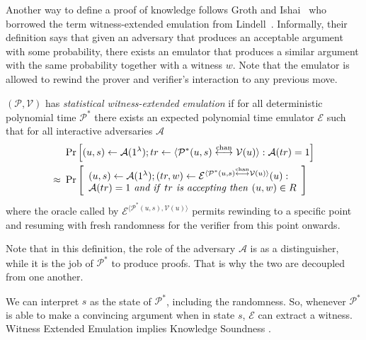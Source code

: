 Another way to define a proof of knowledge follows Groth and Ishai~\cite{GrI08} who borrowed the term witness-extended emulation from Lindell~\cite{Lin03}. Informally, their definition says that given an adversary that produces an acceptable argument with some probability, there exists an emulator that produces a similar argument with the same probability together with a witness $w$. Note that the emulator is allowed to rewind the prover and verifier's interaction to any previous move.

\begin{definition}
$(\mathcal{P},\mathcal{V})$ has {\em statistical witness-extended emulation} if for all deterministic polynomial time $\mathcal{P}^*$ there exists an expected polynomial time emulator $\mathcal{E}$ such that for all interactive adversaries $\mathcal{A}$
\begin{align*}
& \Pr \Big{[}(u,s) \leftarrow\mathcal{A}(1^{\lambda}); tr \leftarrow \langle \mathcal{P}^*(u,s)\overset{\textnormal{chan}}{\longleftrightarrow} \mathcal{V}(u)\rangle: \mathcal{A}(tr)=1 \Big{]}\\
\approx \ & \Pr \left[ \begin{array}{l} (u,s) \leftarrow \mathcal{A}(1^{\lambda}); (tr,w) \leftarrow \mathcal{E}^{ \langle \mathcal{P}^*(u,s) \overset{\textnormal{chan}}{\longleftrightarrow} \mathcal{V}(u) \rangle } (u): \\ \mathcal{A}(tr)=1 \text{\emph{ and if }} tr \text{\emph{ is accepting then }} (u,w) \in R \end{array} \right]
\end{align*}
where the oracle called by $\mathcal{E}^{\langle \mathcal{P}^*(u,s), \mathcal{V}(u)\rangle}$ permits rewinding to a specific point and resuming with fresh randomness for the verifier from this point onwards.
\end{definition}
\noindent
Note that in this definition, the role of the adversary $\mathcal{A}$ is as a distinguisher, while it is the job of $\mathcal{P}^*$ to produce proofs. That is why the two are decoupled from one another.

We can interpret $s$ as the state of $\mathcal{P}^*$, including the randomness. So, whenever $\mathcal{P}^*$ is able to make a convincing argument when in state $s$,  $\mathcal{E}$ can extract a witness. Witness Extended Emulation implies Knowledge Soundness \cite{dissertation}.

